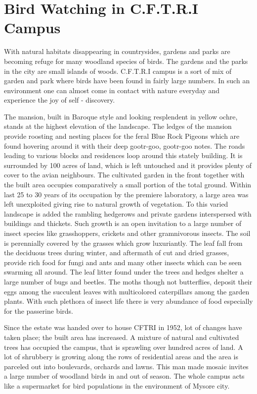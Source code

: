 \chapter{Bird Watching in C.F.T.R.I Campus}

With natural habitats disappearing in countrysides, gardens and parks 
are becoming refuge for many woodland species of birds. The gardens and 
the parks in the city are small islands of woods. C.F.T.R.I campus is a sort of 
mix of garden and park where birds have been found in fairly large numbers. 
In such an environment one can almost come in contact with nature 
everyday and experience the joy of self - discovery. 

The mansion, built in Baroque style and looking resplendent in yellow 
ochre, stands at the highest elevation of the landscape. The ledges of the 
mansion provide roosting and nesting places for the feral Blue Rock Pigeons 
which are found hovering around it with their deep gootr-goo, gootr-goo 
notes. The roads leading to various blocks and residences loop around this 
stately building. It is surrounded by 100 acres of land, which is left 
untouched and it provides plenty of cover to the avian neighbours. The 
cultivated garden in the front together with the built area occupies 
comparatively a small portion of the total ground. Within last 25 to 30 years 
of its occupation by the premiere laboratory, a large area was left 
unexploited giving rise to natural growth of vegetation. To this varied 
landscape is added the rambling hedgerows and private gardens interspersed 
with buildings and thickets. Such growth is an open invitation to a large 
number of insect species like grasshoppers, crickets and other gramnivorous 
insects. The soil is perennially covered by the grasses which grow 
luxuriantly. The leaf fall from the deciduous trees during winter, and 
aftermath of cut and dried grasses, provide rich food for fungi and ants and 
many other insects which can be seen swarming all around. The leaf litter 
found under the trees and hedges shelter a large number of bugs and beetles. 
The moths though not butterflies, deposit their eggs among the succulent 
leaves with multicolored caterpillars among the garden plants. With such 
plethora of insect life there is very abundance of food especially for the 
passerine birds. 

Since the estate was handed over to house CFTRI in 1952, lot of 
changes have taken place; the built area has increased. A mixture of natural 
and cultivated trees has occupied the campus, that is sprawling over hundred 
acres of land. A lot of shrubbery is growing along the rows of residential 
areas and the area is parceled out into boulevards, orchards and lawns. This 
man made mosaic invites a large number of woodland birds in and out of 
season. The whole campus acts like a supermarket for bird populations in 
the environment of Mysore city. 


